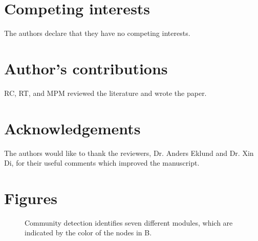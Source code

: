 \documentclass{bmcart}
\begin{document}

\begin{backmatter}

\section*{Competing interests}
  The authors declare that they have no competing interests.

\section*{Author's contributions}
  RC, RT, and MPM reviewed the literature and wrote the paper.

\section*{Acknowledgements}
  The authors would like to thank the reviewers, Dr. Anders Eklund and Dr. Xin Di, for their useful comments which improved the manuscript.
  
  


\section*{Figures}
  \begin{figure}[h!]
  \caption{\label{fig:estimating_connectomes} Community detection identifies seven different modules, which are indicated by the color of the nodes in B.}
      \end{figure}


\end{backmatter}
\end{document}
